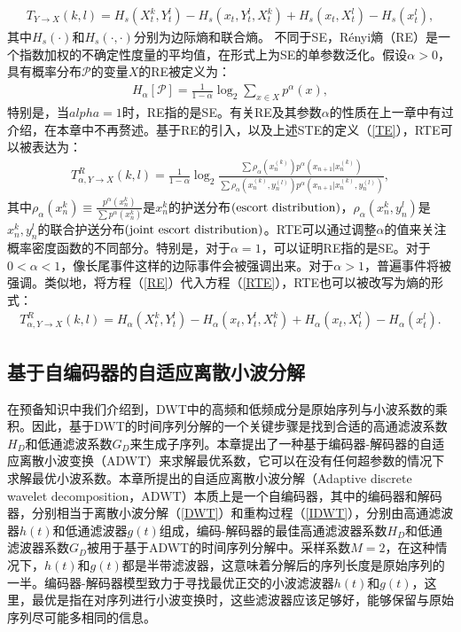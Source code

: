 \begin{align}\label{STE}
T_{Y\rightarrow X}(k,l) = H_{s}(X_{t}^{k},Y_{t}^{l})-H_{s}(x_{t},Y_{t}^{l},X_{t}^{k})+H_{s}(x_{t},X_{t}^{l})-H_{s}(x_{t}^{l}),
\end{align}
其中$H_{s}(\cdot)$和$H_{s}(\cdot, \cdot)$分别为边际熵和联合熵。
不同于SE，R\'enyi熵（RE）是一个指数加权的不确定性度量的平均值，在形式上为SE的单参数泛化。假设$\alpha>0$，具有概率分布$\mathcal{P}$的变量$X$的RE被定义为：
\begin{align}\label{RE}
H_{\alpha}[\mathcal{P}] =\frac{1}{1- \alpha}\log_{2}\sum\limits_{x\in X}p^{\alpha}(x),
\end{align}
特别是，当$alpha=1$时，RE指的是SE。有关RE及其参数$\alpha$的性质在上一章中有过介绍，在本章中不再赘述。基于RE的引入，以及上述STE的定义（\ref{TE}），RTE可以被表达为：
\begin{align}\label{RTE}
T^{R}_{\alpha, Y\rightarrow X}(k,l) =\frac{1}{1- \alpha}\log_{2}\frac{\sum \rho_{\alpha}(x^{(k)}_{n}) p^{\alpha}(x_{n+1}|x_{n}^{(k)})}{\sum \rho_{\alpha}(x^{(k)}_{n}, y_{n}^{(l)}) p^{\alpha}(x_{n+1}|x_{n}^{(k)},y_{n}^{(l)})},
\end{align}
其中$\rho_{\alpha}(x^{k}_{n}) \equiv \frac{p^{\alpha}(x^{k}_{n})}{\sum p^{\alpha}(x^{k}_{n})}$是$x^{k}_{n}$的护送分布$(\rm{escort\ distribution})$，$\rho_{\alpha}(x^{k}_{n}, y_{n}^{l})$是$x^{k}_{n}, y_{n}^{l}$的联合护送分布$(\rm{joint\ escort\ distribution})$。RTE可以通过调整$\alpha$的值来关注概率密度函数的不同部分。特别是，对于$\alpha=1$，可以证明RE指的是SE。对于$0< \alpha<1$，像长尾事件这样的边际事件会被强调出来。对于$\alpha>1$，普遍事件将被强调。类似地，将方程（\ref{RE}）代入方程（\ref{RTE}），RTE也可以被改写为熵的形式：
\begin{align}\label{RTEs}
T^{R}_{\alpha, Y\rightarrow X}(k,l) = H_{\alpha}(X_{t}^{k},Y_{t}^{l})-H_{\alpha}(x_{t},Y_{t}^{l},X_{t}^{k})
+H_{\alpha}(x_{t},X_{t}^{l})-H_{\alpha}(x_{t}^{l}).
\end{align}

\subsection{基于自编码器的自适应离散小波分解}
在预备知识中我们介绍到，DWT中的高频和低频成分是原始序列与小波系数的乘积。因此，基于DWT的时间序列分解的一个关键步骤是找到合适的高通滤波系数$H_{D}$和低通滤波系数$G_{D}$来生成子序列。本章提出了一种基于编码器-解码器的自适应离散小波变换（ADWT）来求解最优系数，它可以在没有任何超参数的情况下求解最优小波系数。本章所提出的自适应离散小波分解（Adaptive discrete wavelet decomposition，ADWT）本质上是一个自编码器，其中的编码器和解码器，分别相当于离散小波分解（\ref{DWT}）和重构过程（\ref{IDWT}），分别由高通滤波器$h(t)$和低通滤波器$g(t)$组成，编码-解码器的最佳高通滤波器系数$H_{D}$和低通滤波器系数$G_{D}$被用于基于ADWT的时间序列分解中。采样系数$M=2$，在这种情况下，$h(t)$和$g(t)$都是半带滤波器，这意味着分解后的序列长度是原始序列的一半。编码器-解码器模型致力于寻找最优正交的小波滤波器$h(t)$和$g(t)$，这里，最优是指在对序列进行小波变换时，这些滤波器应该足够好，能够保留与原始序列尽可能多相同的信息。

